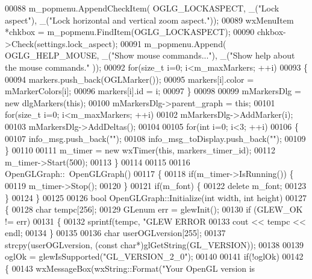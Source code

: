 \begin{DoxyCode}
00088     m_popmenu.AppendCheckItem( OGLG_LOCKASPECT, \_(\textcolor{stringliteral}{"Lock aspect"}), \_(\textcolor{stringliteral}{"Lock horizontal and vertical zoom
       aspect."}));
00089     wxMenuItem *chkbox = m_popmenu.FindItem(OGLG_LOCKASPECT);
00090     chkbox->Check(settings.lock_aspect);
00091     m_popmenu.Append( OGLG_HELP_MOUSE, \_(\textcolor{stringliteral}{"Show mouse commands..."}), \_(\textcolor{stringliteral}{"Show help about the mouse commands."}
      ));
00092     \textcolor{keywordflow}{for}(\textcolor{keywordtype}{size\_t} i=0; i<m_maxMarkers; ++i)
00093     \{
00094         markers.push\_back(OGLMarker());
00095         markers[i].color = mMarkerColors[i];
00096         markers[i].id = i;
00097     \}
00098 
00099     mMarkersDlg = \textcolor{keyword}{new} dlgMarkers(\textcolor{keyword}{this});
00100     mMarkersDlg->parent_graph = \textcolor{keyword}{this};
00101     \textcolor{keywordflow}{for}(\textcolor{keywordtype}{size\_t} i=0; i<m_maxMarkers; ++i)
00102         mMarkersDlg->AddMarker(i);
00103     mMarkersDlg->AddDeltas();
00104 
00105     \textcolor{keywordflow}{for}(\textcolor{keywordtype}{int} i=0; i<3; ++i)
00106     \{
00107         info_msg.push\_back(\textcolor{stringliteral}{""});
00108         info_msg_toDisplay.push\_back(\textcolor{stringliteral}{""});
00109     \}
00110 
00111     m_timer = \textcolor{keyword}{new} wxTimer(\textcolor{keyword}{this}, markers_timer_id);
00112     m_timer->Start(500);
00113 \}
00114 
00115 
00116 OpenGLGraph::~OpenGLGraph()
00117 \{
00118   \textcolor{keywordflow}{if}(m_timer->IsRunning()) \{
00119       m_timer->Stop();
00120   \}
00121   \textcolor{keywordflow}{if}(m_font) \{
00122     \textcolor{keyword}{delete} m_font;
00123   \}
00124 \}
00125 
00126 \textcolor{keywordtype}{bool} OpenGLGraph::Initialize(\textcolor{keywordtype}{int} width, \textcolor{keywordtype}{int} height)
00127 \{
00128     \textcolor{keywordtype}{char} tempc[256];
00129     GLenum err = glewInit();
00130     \textcolor{keywordflow}{if} (GLEW_OK != err)
00131     \{
00132         sprintf(tempc, \textcolor{stringliteral}{"GLEW ERROR %
00133         cout << tempc << endl;
00134     \}
00135 
00136     \textcolor{keywordtype}{char} userOGLversion[255];
00137     strcpy(userOGLversion, (\textcolor{keyword}{const} \textcolor{keywordtype}{char}*)glGetString(GL_VERSION));
00138 
00139     oglOk = glewIsSupported(\textcolor{stringliteral}{"GL\_VERSION\_2\_0"});
00140 
00141     \textcolor{keywordflow}{if}(!oglOk)
00142     \{
00143         wxMessageBox(wxString::Format(\textcolor{stringliteral}{"Your OpenGL version is %
}}
\end{DoxyCode}
